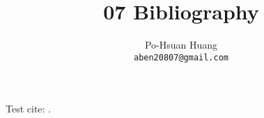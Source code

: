\documentclass[12pt, a4paper]{article}
\title{07 Bibliography}
\author{Po-Hsuan Huang\\ 
    \texttt{aben20807@gmail.com}
}
\begin{document}
\maketitle

Test cite: \cite{XXX, huang2021tonic, huang2022pops, huang2023securetvm}.



\end{document}
